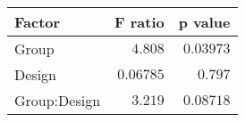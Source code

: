 \begin{tabular}{lrr}
\toprule
       Factor &   F ratio &   p value \\
\midrule
        Group &   $4.808$ & $0.03973$ \\
       Design & $0.06785$ &   $0.797$ \\
 Group:Design &   $3.219$ & $0.08718$ \\
\bottomrule
\end{tabular}
